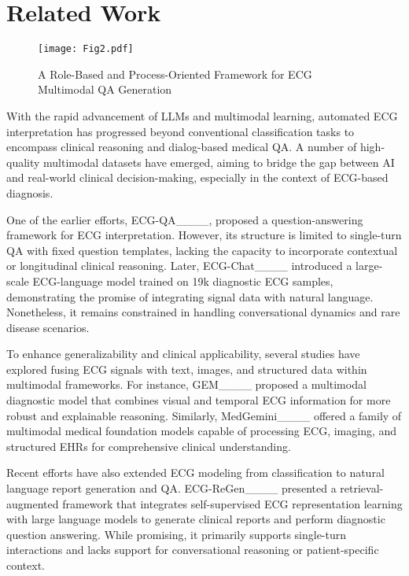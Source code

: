 \section{Related Work}
\label{sec2}
\begin{figure*}[h]
    \centering
    \texttt{[image: Fig2.pdf]}
    \label{fig2}
    \caption{A Role-Based and Process-Oriented Framework for ECG Multimodal QA Generation}
\end{figure*}

With the rapid advancement of LLMs and multimodal learning, automated ECG interpretation has progressed beyond conventional classification tasks to encompass clinical reasoning and dialog-based medical QA. A number of high-quality multimodal datasets have emerged, aiming to bridge the gap between AI and real-world clinical decision-making, especially in the context of ECG-based diagnosis.

One of the earlier efforts, ECG-QA____, proposed a question-answering framework for ECG interpretation. However, its structure is limited to single-turn QA with fixed question templates, lacking the capacity to incorporate contextual or longitudinal clinical reasoning. Later, ECG-Chat____ introduced a large-scale ECG-language model trained on 19k diagnostic ECG samples, demonstrating the promise of integrating signal data with natural language. Nonetheless, it remains constrained in handling conversational dynamics and rare disease scenarios.

To enhance generalizability and clinical applicability, several studies have explored fusing ECG signals with text, images, and structured data within multimodal frameworks. For instance, GEM____ proposed a multimodal diagnostic model that combines visual and temporal ECG information for more robust and explainable reasoning. Similarly, MedGemini____ offered a family of multimodal medical foundation models capable of processing ECG, imaging, and structured EHRs for comprehensive clinical understanding.

Recent efforts have also extended ECG modeling from classification to natural language report generation and QA. ECG-ReGen____ presented a retrieval-augmented framework that integrates self-supervised ECG representation learning with large language models to generate clinical reports and perform diagnostic question answering. While promising, it primarily supports single-turn interactions and lacks support for conversational reasoning or patient-specific context.

